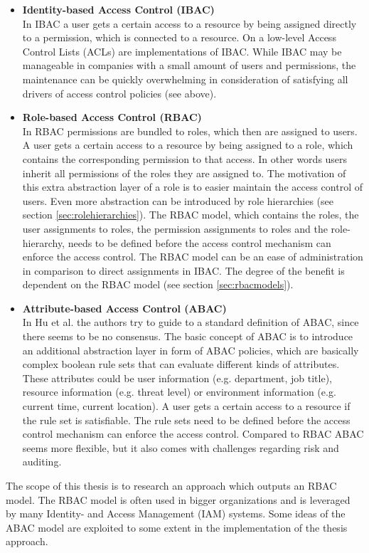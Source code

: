     \begin{itemize}
        \item \textbf{Identity-based Access Control (IBAC)}\\
        In IBAC a user gets a certain access to a resource by being assigned directly to a permission, which is connected to a resource. On a low-level Access Control Lists (ACLs) are implementations of IBAC. While IBAC may be manageable in companies with a small amount of users and permissions, the maintenance can be quickly overwhelming in consideration of satisfying all drivers of access control policies (see above).
        
        \item \textbf{Role-based Access Control (RBAC)}\\
        In RBAC permissions are bundled to roles, which then are assigned to users. A user gets a certain access to a resource by being assigned to a role, which contains the corresponding permission to that access. In other words users inherit all permissions of the roles they are assigned to. The motivation of this extra abstraction layer of a role is to easier maintain the access control of users.
        Even more abstraction can be introduced by role hierarchies (see section \ref{sec:rolehierarchies}). \iffalse , where a role inherits all permissions of its parent-role.\fi The RBAC model, which contains the roles, the user assignments to roles, the permission assignments to roles and the role-hierarchy, needs to be defined before the access control mechanism can enforce the access control. The RBAC model can be an ease of administration in comparison to direct assignments in IBAC. The degree of the benefit is dependent on the RBAC model (see section \ref{sec:rbacmodels}).
        
        \item \textbf{Attribute-based Access Control (ABAC)}\\
        In Hu et al.\cite{Hu13guideto} the authors try to guide to a standard definition of ABAC, since there seems to be no consensus. The basic concept of ABAC is to introduce an additional abstraction layer in form of ABAC policies, which are basically complex boolean rule sets that can evaluate different kinds of attributes. These attributes could be user information (e.g. department, job title), resource information (e.g. threat level) or environment information (e.g. current time, current location). A user gets a certain access to a resource if the rule set is satisfiable. The rule sets need to be defined before the access control mechanism can enforce the access control. Compared to RBAC ABAC seems more flexible, but it also comes with challenges regarding risk and auditing\cite{Coyne:2013}.
    \end{itemize}
    The scope of this thesis is to research an approach which outputs an RBAC model. The RBAC model is often used in bigger organizations\cite{o20102010} and is leveraged by many Identity- and Access Management (IAM) systems. Some ideas of the ABAC model are exploited to some extent in the implementation of the thesis approach.
